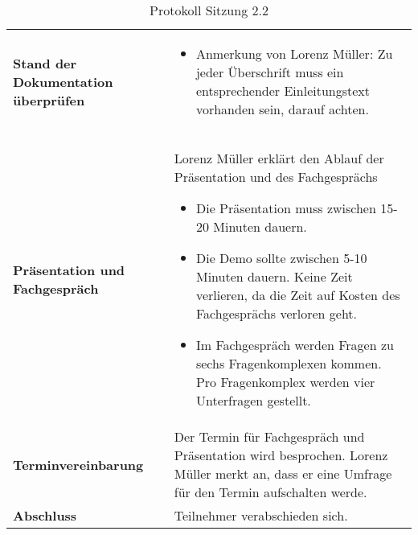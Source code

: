 \newpage

\begin{table}[H]
    \begin{tabular}{|L{0.3\textwidth}|L{0.7\textwidth}|}
        \hline
        \textbf{Stand der Dokumentation überprüfen} & 
        \begin{itemize}
            \item Anmerkung von Lorenz Müller: Zu jeder Überschrift muss ein entsprechender Einleitungstext vorhanden sein, darauf achten.
        \end{itemize} \\
        \textbf{Präsentation und Fachgespräch} & Lorenz Müller erklärt den Ablauf der Präsentation und des Fachgesprächs
        \begin{itemize}
            \item Die Präsentation muss zwischen 15-20 Minuten dauern.
            \item Die Demo sollte zwischen 5-10 Minuten dauern. Keine Zeit verlieren, da die Zeit auf Kosten des Fachgesprächs verloren geht.
            \item Im Fachgespräch werden Fragen zu sechs Fragenkomplexen kommen. Pro Fragenkomplex werden vier Unterfragen gestellt.
        \end{itemize}
        \\
        \hline
        \textbf{Terminvereinbarung} & Der Termin für Fachgespräch und Präsentation wird besprochen. Lorenz Müller merkt an, dass er eine Umfrage für den Termin aufschalten werde. \\
        \hline
        \textbf{Abschluss} & Teilnehmer verabschieden sich.   \\
        \hline
    \end{tabular}
    \caption{Protokoll Sitzung 2.2}
\end{table}




